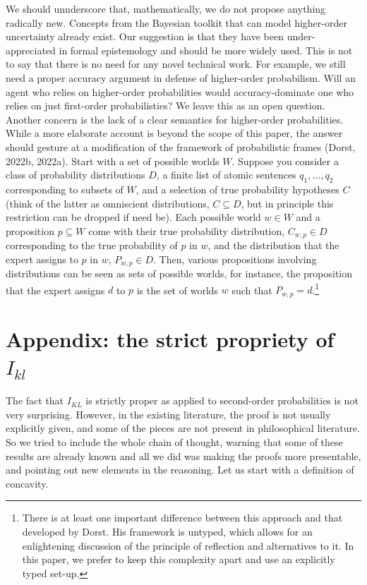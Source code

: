 \documentclass[
  letterpaper,
  DIV=11,
  numbers=noendperiod]{scrartcl}
\begin{document}
We should unnderscore that, mathematically, we do not propose anything
radically new. Concepts from the Bayesian toolkit that can model
higher-order uncertainty already exist. Our suggestion is that they have
been under-appreciated in formal epistemology and should be more widely
used. This is not to say that there is no need for any novel technical
work. For example, we still need a proper accuracy argument in defense
of higher-order probabilism. Will an agent who relies on higher-order
probabilities would accuracy-dominate one who relies on just first-order
probabilisties? We leave this as an open question. Another concern is
the lack of a clear semantics for higher-order probabilities. While a
more elaborate account is beyond the scope of this paper, the answer
should gesture at a modification of the framework of probabilistic
frames (Dorst, 2022b, 2022a). Start with a set of possible worlds \(W\).
Suppose you consider a class of probability distributions \(D\), a
finite list of atomic sentences \(q_1, \dots, q_2\) corresponding to
subsets of \(W\), and a selection of true probability hypotheses \(C\)
(think of the latter as omniscient distributions, \(C\subseteq D\), but
in principle this restriction can be dropped if need be). Each possible
world \(w\in W\) and a proposition \(p\subseteq W\) come with their true
probability distribution, \(C_{w,p}\in D\) corresponding to the true
probability of \(p\) in \(w\), and the distribution that the expert
assigns to \(p\) in \(w\), \(P_{w,p}\in D\). Then, various propositions
involving distributions can be seen as sets of possible worlds, for
instance, the proposition that the expert assigns \(d\) to \(p\) is the
set of worlds \(w\) such that
\(P_{w,p}=d\).\footnote{There is at least one important 
difference between this approach and that developed by Dorst. His framework is untyped, which allows for 
an enlightening discussion of the principle of reflection and alternatives to it. In this paper, we prefer 
to keep this complexity apart and use an explicitly typed set-up.}

\hypertarget{appendix-the-strict-propriety-of-i_kl}{%
\section*{\texorpdfstring{Appendix: the strict propriety of
\(I_{kl}\)}{Appendix: the strict propriety of I\_\{kl\}}}\label{appendix-the-strict-propriety-of-i_kl}}

The fact that \(I_{KL}\) is strictly proper as applied to second-order
probabilities is not very surprising. However, in the existing
literature, the proof is not usually explicitly given, and some of the
pieces are not present in philosophical literature. So we tried to
include the whole chain of thought, warning that some of these results
are already known and all we did was making the proofs more presentable,
and pointing out new elements in the reasoning. Let us start with a
definition of concavity.
\end{document}
